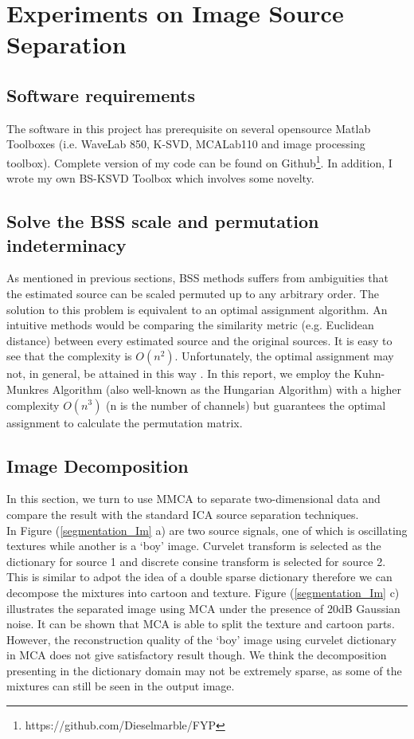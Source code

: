 \section{Experiments on Image Source Separation}
\subsection{Software requirements}
The software in this project has prerequisite on several opensource Matlab Toolboxes (i.e. WaveLab 850, K-SVD, MCALab110 and image processing toolbox). Complete version of my code can be found on Github\footnote{https://github.com/Dieselmarble/FYP}. In addition, I wrote my own BS-KSVD Toolbox which involves some novelty.

\subsection{Solve the BSS scale and permutation indeterminacy}
As mentioned in previous sections, BSS methods suffers from ambiguities that the estimated source can be scaled permuted up to any arbitrary order. The solution to this problem is equivalent to an optimal assignment algorithm. An intuitive methods would be comparing the similarity metric (e.g. Euclidean distance) between every estimated source and the original sources. It is easy to see that the complexity is $O(n^2)$. Unfortunately, the optimal assignment may not, in general, be attained in this way \cite{1261953}. In this report, we employ the Kuhn-Munkres Algorithm (also well-known as the Hungarian Algorithm)
with a higher complexity $O(n^3)$ (n is the number of channels) but guarantees the optimal assignment to calculate the permutation matrix.

\subsection{Image Decomposition}
In this section, we turn to use MMCA to separate two-dimensional data and compare the result with the standard ICA source separation techniques. \\

In Figure (\ref{segmentation_Im} a) are two source signals, one of which is oscillating textures while another is  a `boy' image. Curvelet transform is selected as the dictionary for source 1 and discrete consine transform is selected for source 2. This is similar to adpot the idea of a double sparse dictionary therefore we can decompose the mixtures into cartoon and texture. Figure (\ref{segmentation_Im} c) illustrates the separated image using MCA under the presence of 20dB Gaussian noise. It can be shown that MCA is able to split the texture and cartoon parts. However, the reconstruction quality of the `boy' image using curvelet dictionary in MCA does not give satisfactory result though. We think the decomposition presenting in the dictionary domain may not be extremely sparse, as some of the mixtures can still be seen in the output image. \\

